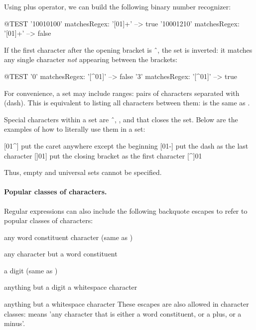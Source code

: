 \documentclass[a4paper,10pt,twoside]{book}
\begin{document}
{ Using plus operator, we can build the following binary number recognizer:

\begin{code}{@TEST} 
'10010100' matchesRegex: '[01]+' --> true 
'10001210' matchesRegex: '[01]+' --> false
\end{code}

 If the first character after the opening bracket is \^\  , the set is inverted: it matches any single character \emph{not} appearing between the brackets:

\begin{code}{@TEST} 	
'0' matchesRegex: '[^01]' --> false 	
'3' matchesRegex: '[^01]' --> true
\end{code}

For convenience, a set may include ranges: pairs of characters separated with \ct{-} (dash). This is equivalent to listing all characters between them:  is the same as . 

Special characters within a set are \^\ , \ct{-}, and \ct{]} that closes the set. Below are the examples of how to literally use them in a set: 	

\begin{code}{}
[01^]	  put the caret anywhere except the beginning 	
[01-]	  put the dash as the last character 
[]01]	  put the closing bracket as the first character  [^]01
\end{code}

Thus, empty and universal sets cannot be specified.

\paragraph{Popular classes of characters.} Regular expressions can also include the following backquote escapes to refer to popular classes of characters: 

\begin{description}	
\item \ct{\w}	any word constituent character (same as \ct{[a-zA-Z0-9...]}) 
\item \ct{\W}	any character but a word constituent 	
\item \ct{\d}	a digit (same as \ct{[0-9]}) 	
\item \ct{\D}	anything but a digit \ct{\s} a whitespace character 
\item \ct{\S} anything but a whitespace character These escapes are also allowed in character classes: \ct{[\w+-]} means 'any character that is either a word constituent, or a plus, or a minus'. 
\end{description}

}
\end{document}

